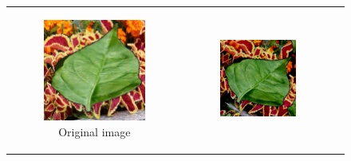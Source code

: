 \documentclass{BachelorBUI}
\begin{document}
        \begin{figure}[h]
            \centering
            \begin{tabular}{ccc}
                \begin{subfigure}{0.30\textwidth}
                    \centering
                    \includegraphics[width=\textwidth]{original_image.jpg}
                    \caption{\centering Original image}
                \end{subfigure} &
                \begin{subfigure}{0.30\textwidth}
                    \centering
                    \includegraphics[width=\textwidth]{1_pipeline.png}

\end{subfigure}
\end{tabular}
\end{figure}
\end{document}
